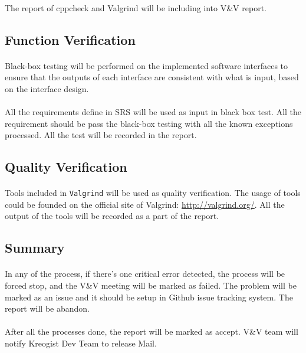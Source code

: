 \documentclass[11pt,a4paper]{article}
\begin{document}
            \paragraph{} The report of cppcheck and Valgrind will be including into V\&V report.
        \subsection{Function Verification}
            \paragraph{} Black-box testing will be performed on the implemented software interfaces to ensure that the outputs of each interface are consistent with what is input, based on the interface design.
            \paragraph{} All the requirements define in SRS will be used as input in black box test. All the requirement should be pass the black-box testing with all the known exceptions processed. All the test will be recorded in the report.
        \subsection{Quality Verification}
            \paragraph{} Tools included in \texttt{Valgrind} will be used as quality verification. The usage of tools could be founded on the official site of Valgrind: \url{http://valgrind.org/}. All the output of the tools will be recorded as a part of the report.
        \subsection{Summary}
            \paragraph{} In any of the process, if there's one critical error detected, the process will be forced stop, and the V\&V meeting will be marked as failed. The problem will be marked as an issue and it should be setup in Github issue tracking system. The report will be abandon.
            \paragraph{} After all the processes done, the report will be marked as accept. V\&V team will notify Kreogist Dev Team to release Mail.
\end{document}
